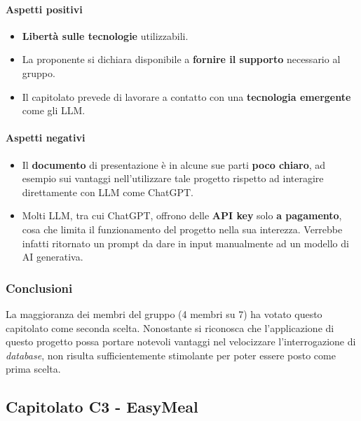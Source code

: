 \documentclass[italian,12pt]{article} %
\begin{document}
\paragraph{Aspetti positivi}
\begin{itemize}
	\item \textbf{Libertà sulle tecnologie} utilizzabili.
	\item La proponente si dichiara disponibile a \textbf{fornire il supporto} necessario al gruppo.
	\item Il capitolato prevede di lavorare a contatto con una \textbf{tecnologia emergente} come gli LLM.
\end{itemize}

\paragraph{Aspetti negativi}
\begin{itemize}
	\item Il \textbf{documento} di presentazione è in alcune sue parti \textbf{poco chiaro}, ad esempio sui vantaggi nell'utilizzare tale progetto rispetto ad interagire
	      direttamente con LLM come ChatGPT.
	\item Molti LLM, tra cui ChatGPT, offrono delle \textbf{API key} solo \textbf{a pagamento}, cosa che limita il funzionamento del progetto nella
	      sua interezza. Verrebbe infatti ritornato un prompt da dare in input manualmente ad un modello di AI generativa.

\end{itemize}

\subsubsection{Conclusioni}
La maggioranza dei membri del gruppo (4 membri su 7) ha votato questo capitolato come seconda scelta. Nonostante si riconosca
che l'applicazione di questo progetto possa portare notevoli vantaggi nel velocizzare l'interrogazione di \textit{database},
non risulta sufficientemente stimolante per poter essere posto come prima scelta.

\subsection{Capitolato C3 - EasyMeal}
\end{document}
